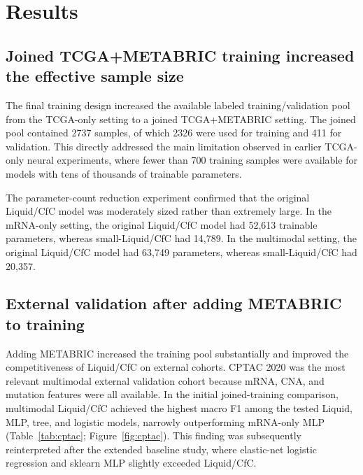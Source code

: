 \section{Results}

\subsection{Joined TCGA+METABRIC training increased the effective sample size}

The final training design increased the available labeled training/validation pool from the TCGA-only setting to a joined TCGA+METABRIC setting. The joined pool contained 2737 samples, of which 2326 were used for training and 411 for validation. This directly addressed the main limitation observed in earlier TCGA-only neural experiments, where fewer than 700 training samples were available for models with tens of thousands of trainable parameters.

The parameter-count reduction experiment confirmed that the original Liquid/CfC model was moderately sized rather than extremely large. In the mRNA-only setting, the original Liquid/CfC model had 52,613 trainable parameters, whereas small-Liquid/CfC had 14,789. In the multimodal setting, the original Liquid/CfC model had 63,749 parameters, whereas small-Liquid/CfC had 20,357.

\subsection{External validation after adding METABRIC to training}

Adding METABRIC increased the training pool substantially and improved the competitiveness of Liquid/CfC on external cohorts. CPTAC 2020 was the most relevant multimodal external validation cohort because mRNA, CNA, and mutation features were all available. In the initial joined-training comparison, multimodal Liquid/CfC achieved the highest macro F1 among the tested Liquid, MLP, tree, and logistic models, narrowly outperforming mRNA-only MLP (Table~\ref{tab:cptac}; Figure~\ref{fig:cptac}). This finding was subsequently reinterpreted after the extended baseline study, where elastic-net logistic regression and sklearn MLP slightly exceeded Liquid/CfC.

